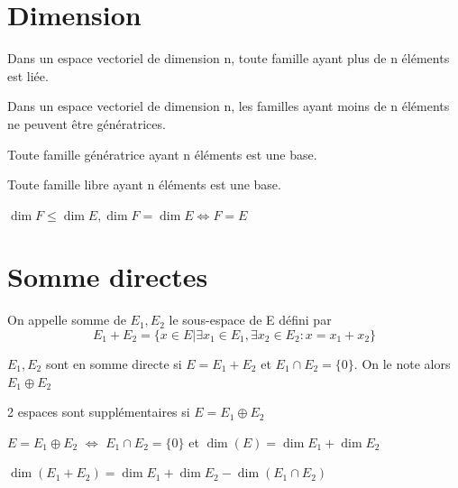 \documentclass[french]{yLectureNote}
\begin{document}
\section{Dimension}
\begin{proposition}
Dans un espace vectoriel de dimension n, toute famille ayant plus de n éléments
est liée.

Dans un espace vectoriel de dimension n, les familles ayant moins de n éléments
ne peuvent être génératrices.
\end{proposition}
\begin{proposition}
Toute famille génératrice ayant n éléments est une base.

Toute famille libre ayant n éléments est une base.
\end{proposition}
\begin{theorem}
\(\dim F \leq \dim E, \dim F = \dim E \iff F=E\)
\end{theorem}
\section{Somme directes}
\begin{definition}[Somme]
On appelle somme de \(E_1,E_2\) le sous-espace de E défini par \[E_1+E_2 = \{x\in E |\exists x_1\in E_1, \exists x_2\in E_2 : x=x_1+x_2\}\]
\end{definition}
\begin{proposition}
\(E_1, E_2\) sont en somme directe si \(E = E_1+E_2\) et \(E_1\cap E_2 = \{0\}\). On le note alors \(E_1\oplus E_2\)
\end{proposition}
\begin{proposition}
2 espaces sont supplémentaires si \(E = E_1 \oplus E_2\)
\end{proposition}
\begin{proposition}
\(E = E_1\oplus E_2\) \(\iff\) \(E_1\cap E_2  = \{0\}\) et \(\dim(E) = \dim E_1+\dim E_2\)
\end{proposition}
\begin{theorem}
 \(\dim(E_1+E_2) = \dim E_1+\dim E_2-\dim(E_1\cap E_2)\)
\end{theorem}
\end{document}
